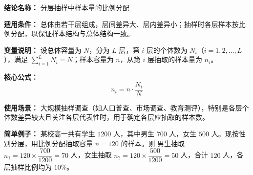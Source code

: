 \textbf{结论名称：} 分层抽样中样本量的比例分配

\textbf{适用条件：} 总体由若干层组成，层间差异大、层内差异小；抽样时各层样本按比例分配，以保证样本结构与总体结构一致。

\textbf{变量说明：} 设总体容量为 \(N\)，分为 \(L\) 层，第 \(i\) 层的个体数为 \(N_i\)（\(i=1,2,\dots,L\)），满足 \(\sum_{i=1}^{L} N_i = N\)；样本容量为 \(n\)，从第 \(i\) 层抽取的样本量为 \(n_i\)。

\textbf{核心公式：} 
\[
\boxed{n_i = n \cdot \frac{N_i}{N}}
\]

\textbf{使用场景：} 大规模抽样调查（如人口普查、市场调查、教育测评），特别是各层个体数差异较大且关注各层代表性时，用于确定各层应抽取的样本数。

\textbf{简单例子：} 
某校高一共有学生 \(1200\) 人，其中男生 \(700\) 人，女生 \(500\) 人。现按性别分层，用比例分配抽取容量 \(n=120\) 的样本。则
男生抽取 \(n_1 = 120 \times \dfrac{700}{1200} = 70\) 人，女生抽取 \(n_2 = 120 \times \dfrac{500}{1200} = 50\) 人，合计 \(120\) 人，各层抽样比例均为 \(10\%\)。